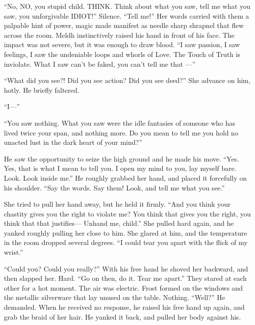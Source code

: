 “No, NO, you stupid child. THINK. Think about what you saw, tell me what you saw, you unforgivable{\el} IDIOT!”
\SmallVSpace
Silence.
\SmallVSpace
“Tell me!”
\SmallVSpace
Her words carried with them a palpable hint of power, magic made manifest as needle sharp shrapnel that flew across the room. Meldh instinctively raised his hand in front of his face. The impact was not severe, but it was enough to draw blood. “I saw passion, I saw feelings, I saw the undeniable loops and whorls of Love. The Touch of Truth is inviolate. What I saw can’t be faked, you can’t tell me that \mbox{---}”

“What did you see?! Did you see action? Did you see deed?” She advance on him, hotly. He briefly faltered.

“I\mbox{---}”

“You saw nothing. What you saw were the idle fantasies of someone who has lived twice your span, and nothing more. Do you mean to tell me you hold no unacted lust in the dark heart of your mind?”

He saw the opportunity to seize the high ground and he made his move. “Yes. Yes, that is what I mean to tell you. I open my mind to you, lay myself bare. Look. Look inside me.” He roughly grabbed her hand, and placed it forcefully on his shoulder. “Say the words. Say them! Look, and tell me what you see.”

She tried to pull her hand away, but he held it firmly. “And you think your chastity gives you the right to violate me? You think that gives you the right, you think that that justifies\mbox{---} Unhand me, child.” She pulled hard again, and he yanked roughly pulling her close to him. She glared at him, and the temperature in the room dropped several degrees. “I could tear you apart with the flick of my wrist.”

“Could you? Could you really?” With his free hand he shoved her backward, and then slapped her. Hard. “Go on then, do it. Tear me apart.” They stared at each other for a hot moment. The air was electric. Frost formed on the windows and the metallic silverware that lay unused on the table.
\SmallVSpace
Nothing.
\SmallVSpace
“Well?” He demanded. When he received no response, he raised his free hand up again, and grab the braid of her hair. He yanked it back, and pulled her body against his.

